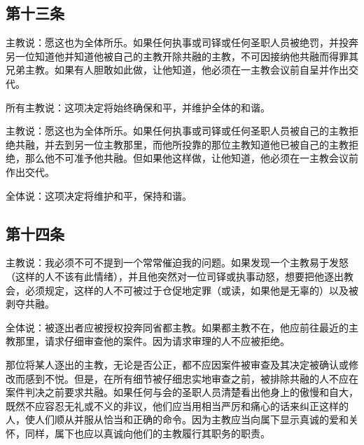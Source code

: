 
\subsection{第十三条}

主教说：愿这也为全体所乐。如果任何执事或司铎或任何圣职人员被绝罚，并投奔另一位知道他并知道他被自己的主教开除共融的主教，不可因接纳他共融而得罪其兄弟主教。如果有人胆敢如此做，让他知道，他必须在一主教会议前自呈并作出交代。\par

所有主教说：这项决定将始终确保和平，并维护全体的和谐。\par

主教说：愿这也为全体所乐。如果任何执事或司铎或任何圣职人员被自己的主教拒绝共融，并去到另一位主教那里，而他所投靠的那位主教知道他已被自己的主教拒绝，那么他不可准予他共融。但如果他这样做，让他知道，他必须在一主教会议前作出交代。\par

全体说：这项决定将维护和平，保持和谐。\par


\subsection{第十四条}

主教说：我必须不可不提到一个常常催迫我的问题。如果发现一个主教易于发怒（这样的人不该有此情绪），并且他突然对一位司铎或执事动怒，想要把他逐出教会，必须规定，这样的人不可被过于仓促地定罪（或读，如果他是无辜的）以及被剥夺共融。\par

全体说：被逐出者应被授权投奔同省都主教。如果都主教不在，他应前往最近的主教那里，请求仔细审查他的案件。因为请求审理的人不应被拒绝。\par

那位将某人逐出的主教，无论是否公正，都不应因案件被审查及其决定被确认或修改而感到不悦。但是，在所有细节被仔细忠实地审查之前，被排除共融的人不应在案件判决之前要求共融。如果任何与会的圣职人员清楚看出他身上的傲慢和自大，既然不应容忍无礼或不义的非议，他们应当用相当严厉和痛心的话来纠正这样的人，使人们顺从并服从恰当和正确的命令。因为主教应当向属下显示真诚的爱和关怀，同样，属下也应以真诚向他们的主教履行其职务的职责。\par

